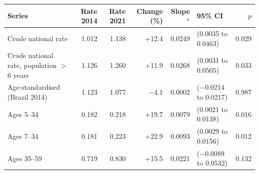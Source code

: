 \begin{tabular}{lrrrrlr}
\toprule
Series & Rate 2014 & Rate 2021 & Change (\%) & Slope$^{a}$ & 95\% CI & $p$ \\
\midrule
Crude national rate & 1.012 & 1.138 & +12.4 & 0.0249 & (0.0035 to 0.0463) & 0.029 \\
Crude national rate, population $>$6 years & 1.126 & 1.260 & +11.9 & 0.0268 & (0.0031 to 0.0505) & 0.033 \\
Age-standardised (Brazil 2014) & 1.123 & 1.077 & $-$4.1 & 0.0002 & ($-$0.0214 to 0.0217) & 0.987 \\
Ages 5--34 & 0.182 & 0.218 & +19.7 & 0.0079 & (0.0021 to 0.0138) & 0.016 \\
Ages 7--34 & 0.181 & 0.223 & +22.9 & 0.0093 & (0.0029 to 0.0156) & 0.012 \\
Ages 35--59 & 0.719 & 0.830 & +15.5 & 0.0221 & ($-$0.0089 to 0.0532) & 0.132 \\
\bottomrule
\end{tabular}

